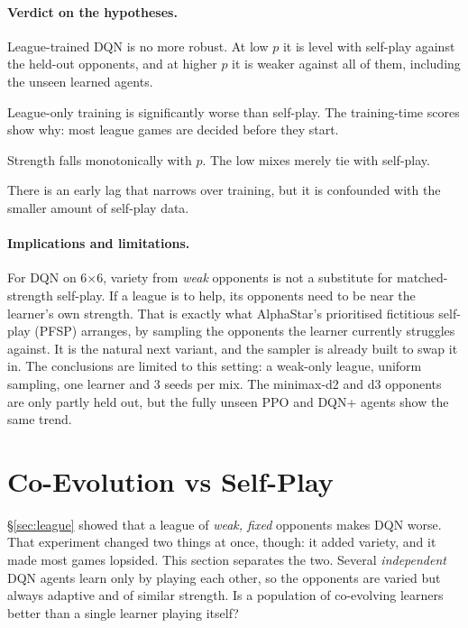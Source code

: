 \documentclass[11pt]{article}
\newcommand{\bx}[1]{#1$\times$#1}
\begin{document}
\paragraph{Verdict on the hypotheses.}
\begin{description}[leftmargin=1.2em,style=nextline,itemsep=2pt]
  \item[H1 (robustness): refuted.] League-trained DQN is no more robust. At low $p$ it is
        level with self-play against the held-out opponents, and at higher $p$
        it is weaker against all of them, including the unseen learned agents.
  \item[H2 (weak signal): supported.] League-only training is significantly
        worse than self-play. The training-time scores show why: most league
        games are decided before they start.
  \item[H3 (best mix): refuted.] Strength falls monotonically with $p$. The low
        mixes merely tie with self-play.
  \item[H4 (replay dilution): partly supported.] There is an early lag that
        narrows over training, but it is confounded with the smaller amount of
        self-play data.
\end{description}

\paragraph{Implications and limitations.} For DQN on \bx{6}, variety from
\emph{weak} opponents is not a substitute for matched-strength self-play. If a
league is to help, its opponents need to be near the learner's own strength.
That is exactly what AlphaStar's prioritised fictitious self-play (PFSP)
arranges, by sampling the opponents the learner currently struggles against. It
is the natural next variant, and the sampler is already built to swap it in. The
conclusions are limited to this setting: a weak-only league, uniform sampling,
one learner and 3 seeds per mix. The minimax-d2 and d3 opponents are only partly
held out, but the fully unseen PPO and DQN+ agents show the same trend.

\section{Co-Evolution vs Self-Play}
\label{sec:coevo}

\S\ref{sec:league} showed that a league of \emph{weak, fixed} opponents makes DQN
worse. That experiment changed two things at once, though: it added variety,
and it made most games lopsided. This section separates the two. Several
\emph{independent} DQN agents learn only by playing each other, so the
opponents are varied but always adaptive and of similar strength. Is a
population of co-evolving learners better than a single learner playing
itself?
\end{document}
